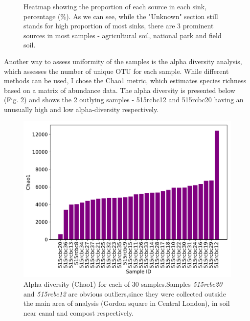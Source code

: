 \documentclass{article}
\begin{document}
\begin{multicols}{2}
\begin{figure}[H]
	\caption{Heatmap showing the proportion of each source in each sink, percentage (\%). As we can see, while the "Unknown" section still stands for high proportion of most sinks, there are 3 prominent sources in most samples - agricultural soil, national park and field soil.}
	\label{fig:sourcetracker_heatmap}
\end{figure}
\par
Another way to assess uniformity of the samples is the alpha diversity analysis, which assesses the number of unique OTU for each sample. While different methods can be used, I chose the Chao1 metric, which estimates species richness based on a matrix of abundance data. The alpha diversity is presented below (Fig. \ref{fig:alpha_diversity}) and shows the 2 outlying samples - 515rcbc12 and 515rcbc20 having an unusually high and low alpha-diversity respectively.
\begin{figure}[H]
	\captionsetup{width=\linewidth}
	\includegraphics[width=\linewidth]{../analyses/figs/chao1_alpha.pdf}
	\caption{Alpha diversity (Chao1) for each of 30 samples.Samples \textit{515rcbc20} and \textit{515rcbc12} are obvious outliers,since they were collected outside the main area of analysis (Gordon square in Central London), in soil near canal and compost respectively.}
	\label{fig:alpha_diversity}
\end{figure}
\begin{figure}[H]
	\captionsetup{width=\linewidth}

\end{figure}
\end{multicols}
\end{document}
